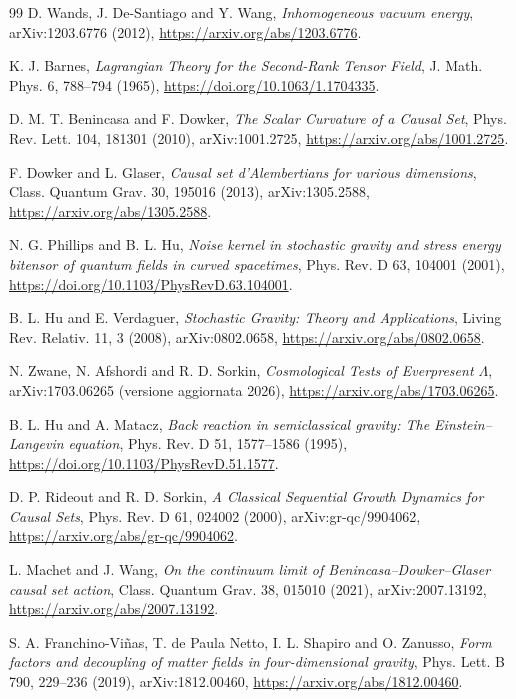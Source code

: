 \documentclass[11pt,a4paper]{article}
\begin{document}
\begin{thebibliography}{99}
D. Wands, J. De-Santiago and Y. Wang,
\textit{Inhomogeneous vacuum energy},
arXiv:1203.6776 (2012),
\url{https://arxiv.org/abs/1203.6776}.

K. J. Barnes,
\textit{Lagrangian Theory for the Second-Rank Tensor Field},
J. Math. Phys. 6, 788--794 (1965),
\url{https://doi.org/10.1063/1.1704335}.

D. M. T. Benincasa and F. Dowker,
\textit{The Scalar Curvature of a Causal Set},
Phys. Rev. Lett. 104, 181301 (2010),
arXiv:1001.2725,
\url{https://arxiv.org/abs/1001.2725}.

F. Dowker and L. Glaser,
\textit{Causal set d'Alembertians for various dimensions},
Class. Quantum Grav. 30, 195016 (2013),
arXiv:1305.2588,
\url{https://arxiv.org/abs/1305.2588}.

N. G. Phillips and B. L. Hu,
\textit{Noise kernel in stochastic gravity and stress energy bitensor of quantum fields in curved spacetimes},
Phys. Rev. D 63, 104001 (2001),
\url{https://doi.org/10.1103/PhysRevD.63.104001}.

B. L. Hu and E. Verdaguer,
\textit{Stochastic Gravity: Theory and Applications},
Living Rev. Relativ. 11, 3 (2008),
arXiv:0802.0658,
\url{https://arxiv.org/abs/0802.0658}.

N. Zwane, N. Afshordi and R. D. Sorkin,
\textit{Cosmological Tests of Everpresent $\Lambda$},
arXiv:1703.06265 (versione aggiornata 2026),
\url{https://arxiv.org/abs/1703.06265}.


B. L. Hu and A. Matacz,
\textit{Back reaction in semiclassical gravity: The Einstein--Langevin equation},
Phys. Rev. D 51, 1577--1586 (1995),
\url{https://doi.org/10.1103/PhysRevD.51.1577}.

D. P. Rideout and R. D. Sorkin,
\textit{A Classical Sequential Growth Dynamics for Causal Sets},
Phys. Rev. D 61, 024002 (2000),
arXiv:gr-qc/9904062,
\url{https://arxiv.org/abs/gr-qc/9904062}.

L. Machet and J. Wang,
\textit{On the continuum limit of Benincasa--Dowker--Glaser causal set action},
Class. Quantum Grav. 38, 015010 (2021),
arXiv:2007.13192,
\url{https://arxiv.org/abs/2007.13192}.

S. A. Franchino-Vi\~nas, T. de Paula Netto, I. L. Shapiro and O. Zanusso,
\textit{Form factors and decoupling of matter fields in four-dimensional gravity},
Phys. Lett. B 790, 229--236 (2019),
arXiv:1812.00460,
\url{https://arxiv.org/abs/1812.00460}.



\end{thebibliography}
\end{document}
